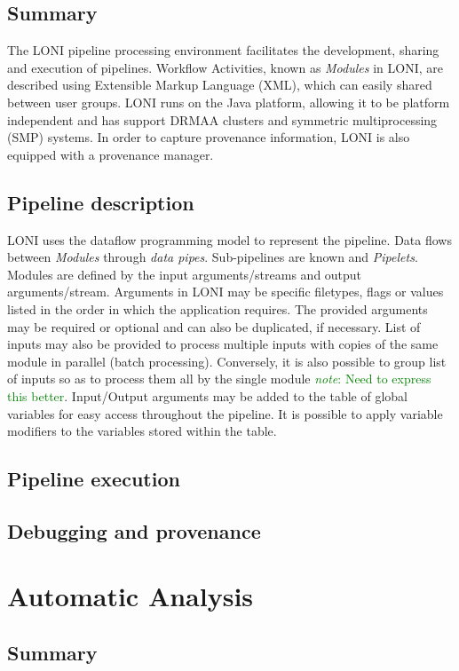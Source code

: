 \documentclass{report}
\newcommand{\note}[1]{\textcolor{green}{\textit{note}: #1}}
\begin{document}
        \subsection{Summary}
        The LONI pipeline processing environment facilitates the development,
sharing and execution of pipelines. Workflow Activities, known as \textit{Modules} in
LONI, are described using Extensible Markup Language (XML), which can easily
shared between user groups. LONI runs on the Java platform, allowing it to be
platform independent and has support DRMAA clusters and symmetric
multiprocessing (SMP) systems. In order to
capture provenance information, LONI is also equipped with a provenance manager.
  
        \subsection{Pipeline description}
        LONI uses the dataflow programming model to represent the pipeline. Data
flows between \textit{Modules} through \textit{data pipes}. Sub-pipelines are
known and \textit{Pipelets}. Modules are defined by the input arguments/streams
and output arguments/stream. Arguments in LONI may be specific
filetypes, flags or values listed in the order in which the application
requires. The provided arguments may be required or optional and can also be
duplicated, if necessary. List of inputs may also be provided to process
multiple inputs with copies of the same module in parallel (batch processing). Conversely, it is
also possible to group list of inputs so as to process them all by the single
module \note{Need to express this better}. Input/Output arguments may be added
to the table of global variables for easy access throughout the pipeline. It is
possible to apply variable modifiers to the variables stored within the table.   
        \subsection{Pipeline execution}
        \subsection{Debugging and provenance}
    \section{Automatic Analysis}
        \subsection{Summary}
\end{document}
